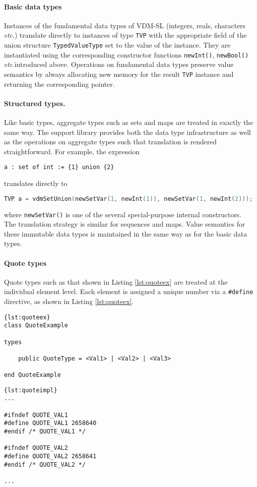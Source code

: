 \paragraph{Basic data types}
Instances of the fundamental data types of VDM-SL (integers, reals, characters \emph{etc}.\@) translate directly to instances of type \texttt{TVP} with the appropriate field of the union structure \texttt{TypedValueType} set to the value of the instance.
%
They are instantiated using the corresponding constructor functions \texttt{newInt()}, \texttt{newBool()} \emph{etc}.\@ introduced above.
%
Operations on fundamental data types preserve value semantics by always allocating new memory for the result \texttt{TVP} instance and returning the corresponding pointer.
%
\paragraph{Structured types.}
Like basic types, aggregate types such as sets and maps are treated in exactly the same way.
%
The support library provides both the data type infrastructure as well as the operations on aggregate types such that translation is rendered straightforward.
%
For example, the expression
%
%
%
\begin{lstlisting}[language=VDM++,frame=tlbr]
a : set of int := {1} union {2}
\end{lstlisting}
%
%
%
translates directly to 
%
%
%
\begin{lstlisting}[language=C,frame=tlbr]
TVP a = vdmSetUnion(newSetVar(1, newInt(1)), newSetVar(1, newInt(2)));
\end{lstlisting}
%
%
%
where \texttt{newSetVar()} is one of the several special-purpose internal constructors.
%
The translation strategy is similar for sequences and maps.
%
Value semantics for these immutable data types is maintained in the same way as for the basic data types.
%
%
%
\paragraph{Quote types}
Quote types such as that shown in Listing \ref{lst:quoteex} are treated at the individual element level.
%
Each element is assigned a unique number via a \texttt{\#define} directive, as shown in Listing \ref{lst:quoteex}.
%
%
%
\begin{lstlisting}[language=VDM++,caption={Quote type example.},label={lst:quoteex},frame=tlbr]{lst:quoteex}
class QuoteExample

types

	public QuoteType = <Val1> | <Val2> | <Val3>

end QuoteExample
\end{lstlisting}
%
%
%
\begin{lstlisting}[language=VDM++,caption={Quote type example translation.},label={lst:quoteimpl},frame=tlbr]{lst:quoteimpl}
...

#ifndef QUOTE_VAL1
#define QUOTE_VAL1 2658640
#endif /* QUOTE_VAL1 */

#ifndef QUOTE_VAL2
#define QUOTE_VAL2 2658641
#endif /* QUOTE_VAL2 */

...
\end{lstlisting}
%
%
%

